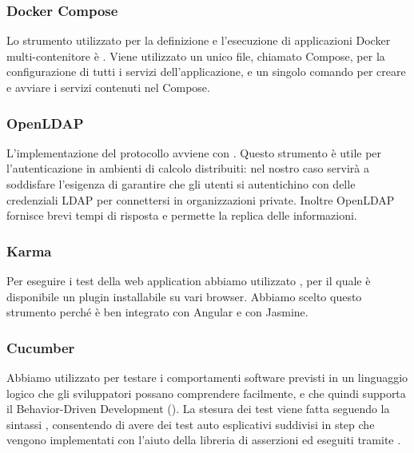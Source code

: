 \documentclass[../../manuale-manutentore.tex]{subfiles}
\begin{document}
\subsubsection{Docker Compose}%
\label{subs:docker_compose}

Lo strumento utilizzato per la definizione e l'esecuzione di applicazioni Docker multi-contenitore è .
Viene utilizzato un unico file, chiamato Compose, per la configurazione di tutti i servizi dell'applicazione, e un singolo comando per creare e avviare i servizi contenuti nel Compose.

\subsubsection{OpenLDAP}%
\label{subs:openldap}
L'implementazione del protocollo  avviene con .
Questo strumento è utile per l'autenticazione in ambienti di calcolo distribuiti: nel nostro caso servirà a soddisfare l'esigenza di garantire che gli utenti si autentichino con delle credenziali LDAP per connettersi in organizzazioni private.
Inoltre OpenLDAP fornisce brevi tempi di risposta e permette la replica delle informazioni.

\subsubsection{Karma}%
\label{subs:karma}

Per eseguire i test della web application abbiamo utilizzato , per il quale è disponibile un plugin installabile su vari browser.
Abbiamo scelto questo strumento perché è ben integrato con Angular e con Jasmine.

\subsubsection{Cucumber}%
\label{subs:cucumber}

Abbiamo utilizzato  per testare i comportamenti software previsti in un linguaggio logico che gli sviluppatori possano comprendere facilmente, e che quindi supporta il Behavior-Driven Development ().
La stesura dei test viene fatta seguendo la sintassi , consentendo di avere dei test auto esplicativi suddivisi in step che vengono implementati con l'aiuto della libreria di asserzioni  ed eseguiti tramite .
\end{document}
